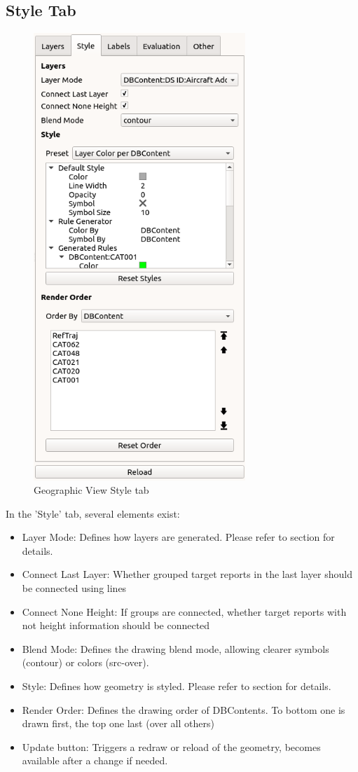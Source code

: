 \subsection{Style Tab}
\label{sec:geoview_style}

\begin{figure}[H]
   \center
    \includegraphics[width=8cm,frame]{figures/geoview_style_tab.png}
  \caption{Geographic View Style tab}
\end{figure}

In the 'Style' tab, several elements exist:

\begin{itemize}
 \item Layer Mode: Defines how layers are generated. Please refer to section  for details.
 \item Connect Last Layer: Whether grouped target reports in the last layer should be connected using lines
 \item Connect None Height: If groups are connected, whether target reports with not height information should be connected
 \item Blend Mode: Defines the drawing blend mode, allowing clearer symbols (contour) or colors (src-over).
 \item Style: Defines how geometry is styled. Please refer to section  for details.
 \item Render Order: Defines the drawing order of DBContents. To bottom one is drawn first, the top one last (over all others)
 \item Update button: Triggers a redraw or reload of the geometry, becomes available after a change if needed.
\end{itemize} 

